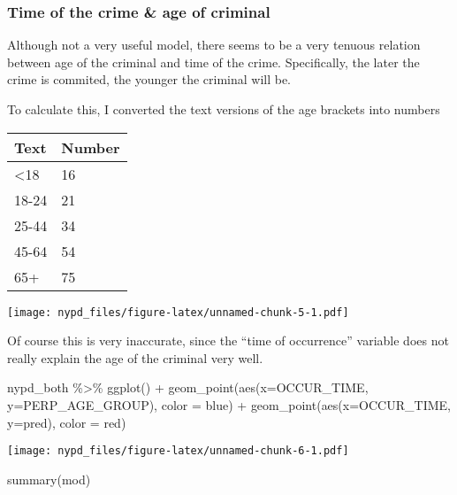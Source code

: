 \documentclass[
]{article}
\newenvironment{Shaded}{\begin{snugshade}}{\end{snugshade}}
\newcommand{\AttributeTok}[1]{\textcolor[rgb]{0.77,0.63,0.00}{#1}}
\newcommand{\FunctionTok}[1]{\textcolor[rgb]{0.00,0.00,0.00}{#1}}
\newcommand{\NormalTok}[1]{#1}
\newcommand{\SpecialCharTok}[1]{\textcolor[rgb]{0.00,0.00,0.00}{#1}}
\newcommand{\StringTok}[1]{\textcolor[rgb]{0.31,0.60,0.02}{#1}}
\begin{document}
\hypertarget{time-of-the-crime-age-of-criminal}{%
\subsubsection{Time of the crime \& age of
criminal}\label{time-of-the-crime-age-of-criminal}}

Although not a very useful model, there seems to be a very tenuous
relation between age of the criminal and time of the crime.
Specifically, the later the crime is commited, the younger the criminal
will be.

To calculate this, I converted the text versions of the age brackets
into numbers

\begin{longtable}[]{@{}ll@{}}
\toprule
Text & Number \\
\midrule
\endhead
\textless18 & 16 \\
18-24 & 21 \\
25-44 & 34 \\
45-64 & 54 \\
65+ & 75 \\
\bottomrule
\end{longtable}

\texttt{[image: nypd\_files/figure-latex/unnamed-chunk-5-1.pdf]}

Of course this is very inaccurate, since the ``time of occurrence''
variable does not really explain the age of the criminal very well.

\begin{Shaded}
\begin{Highlighting}[]
\NormalTok{nypd\_both }\SpecialCharTok{\%\textgreater{}\%} \FunctionTok{ggplot}\NormalTok{() }\SpecialCharTok{+} 
  \FunctionTok{geom\_point}\NormalTok{(}\FunctionTok{aes}\NormalTok{(}\AttributeTok{x=}\NormalTok{OCCUR\_TIME, }\AttributeTok{y=}\NormalTok{PERP\_AGE\_GROUP), }\AttributeTok{color =} \StringTok{\textquotesingle{}blue\textquotesingle{}}\NormalTok{) }\SpecialCharTok{+}
  \FunctionTok{geom\_point}\NormalTok{(}\FunctionTok{aes}\NormalTok{(}\AttributeTok{x=}\NormalTok{OCCUR\_TIME, }\AttributeTok{y=}\NormalTok{pred), }\AttributeTok{color =} \StringTok{\textquotesingle{}red\textquotesingle{}}\NormalTok{)}
\end{Highlighting}
\end{Shaded}

\texttt{[image: nypd\_files/figure-latex/unnamed-chunk-6-1.pdf]}

\begin{Shaded}
\begin{Highlighting}[]
\FunctionTok{summary}\NormalTok{(mod)}
\end{Highlighting}
\end{Shaded}
\end{document}

